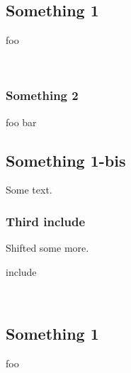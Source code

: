 \subsection{Something 1\label{something-1}}%
foo

\label{package-test+u+package+++ml-module-Include+u+sections-val-foo}\\
\subsubsection{Something 2\label{something-2}}%
\label{package-test+u+package+++ml-module-Include+u+sections-val-bar}\begin{ocamlindent}foo bar\end{ocamlindent}%
\medbreak
\subsection{Something 1-bis\label{something-1-bis}}%
Some text.

\subsubsection{Third include\label{third-include}}%
Shifted some more.

\begin{ocamlkeyword}include\end{ocamlkeyword}
 \hyperref[package-test+u+package+++ml-module-Include+u+sections-module-type-Something]{}\label{package-test+u+package+++ml-module-Include+u+sections-val-something}\\
\subsection{Something 1\label{something-1}}%
foo

\label{package-test+u+package+++ml-module-Include+u+sections-val-foo}\\
